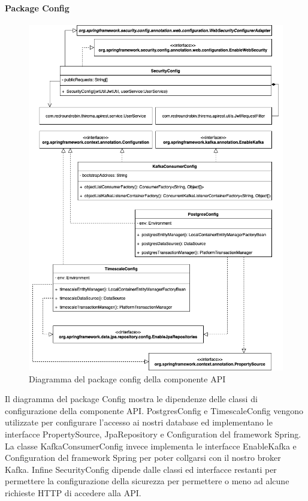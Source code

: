 		\paragraph*{Package Config} 
		\begin{figure}[H]
			\centering
			\includegraphics[scale=0.550]{res/images/API/ConfigPackage.png}
			\caption{Diagramma del package config della componente API}
			\label{Diagramma 12}
		\end{figure}
		Il diagramma del package Config mostra le dipendenze delle classi di configurazione della componente API.  PostgresConfig e TimescaleConfig vengono utilizzate per configurare l'accesso ai nostri database ed implementano le interfacce PropertySource, JpaRepository e Configuration del framework Spring. La classe KafkaConsumerConfig invece implementa le interfacce EnableKafka e Configuration del framework Spring per poter collgarsi con il nostro broker Kafka. Infine SecurityConfig dipende dalle classi ed interfacce restanti per permettere la configurazione della sicurezza per permettere o meno ad alcune richieste HTTP di accedere alla API.
		\newpage
